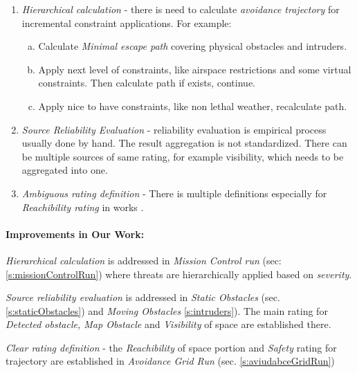 \begin{enumerate}
    \item \emph{Hierarchical calculation} - there is need to calculate \emph{avoidance trajectory} for incremental constraint applications. For example:
    \begin{enumerate}[a.]
        \item Calculate \emph{Minimal escape path} covering physical obstacles and intruders.
        \item Apply next level of constraints, like airspace restrictions and some virtual constraints. Then calculate path if exists, continue.
        \item Apply nice to have constraints, like non lethal weather, recalculate path.
    \end{enumerate}
    
    \item \emph{Source Reliability Evaluation} -  reliability evaluation is empirical process usually done by hand. The result aggregation is not standardized. There can be multiple sources of same rating, for example visibility, which needs to be aggregated into one.  
    
    \item \emph{Ambiguous rating definition} - There is multiple definitions especially for \emph{Reachibility rating} in works \cite{kothari2013probabilistically,blackmore2006probabilistic,gessel1986probabilistic}.
    
\end{enumerate}

\paragraph{Improvements in Our Work:}

\emph{Hierarchical calculation} is addressed in \emph{Mission Control run} (sec: \ref{s:missionControlRun}) where threats are hierarchically applied based on \emph{severity}.

\emph{Source reliability evaluation} is addressed in \emph{Static Obstacles} (sec. \ref{s:staticObstacles}) and \emph{Moving Obstacles} \ref{s:intruders}). The main rating for \emph{Detected obstacle, Map Obstacle} and \emph{Visibility} of space are established there. 

\emph{Clear rating definition} - the \emph{Reachibility} of space portion and \emph{Safety} rating for trajectory are established in \emph{Avoidance Grid Run} (sec. \ref{s:aviudabceGridRun})



